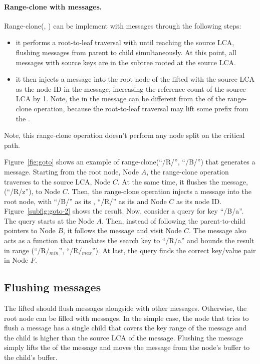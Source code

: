 \paragraph{Range-clone with \goto messages.}

Range-clone(\spre, \dpre) can be implement with \goto messages through the
following steps:
\begin{itemize}
\item it performs a root-to-leaf traversal with \spre until reaching the source
LCA, flushing messages from parent to child simultaneously.
At this point, all messages with source keys are in the subtree rooted at the
source LCA.
\item it then injects a \goto message into the root node of the lifted \bedag
with the source LCA as the node ID in the \goto message, increasing the
reference count of the source LCA by 1.
Note, the \spre in the \goto message can be different from the \spre of the
range-clone operation,
because the root-to-leaf traversal may lift some prefix from the \spre.
\end{itemize}
Note, this range-clone operation doesn't perform any node split on the critical
path.

Figure~\ref{fig:goto} shows an example of range-clone(``/R/'', ``/B/'')
that generates a \goto message.
Starting from the root node, Node $A$, the range-clone operation traverses to
the source LCA, Node $C$.
At the same time, it flushes the message, \delm(``/R/z''), to Node $C$.
Then, the range-clone operation injects a \goto message into the root node,
with ``/B/'' as its \dpre, ``/R/'' as its \spre and Node $C$ as its node ID.
Figure~\ref{subfig:goto-2} shows the result.
Now, consider a query for key ``/B/a''.
The query starts at the Node $A$.
Then, instead of following the parent-to-child pointers to Node $B$, it follows
the \goto message and visit Node $C$.
The \goto message also acts as a \xf function that translates the search key
to ``/R/a'' and bounds the result in range (``/R/$_{min}$'', ``/R/$_{max}$'').
At last, the query finds the correct key/value pair in Node $F$.

\subsection{Flushing \goto messages}
\label{sec:rc:flush}

The lifted \bedag should flush \goto messages alongside with other messages.
Otherwise, the root node can be filled with \goto messages.
In the simple case, the node that tries to flush a \goto message has a single
child that covers the key range of the \goto message
and the child is higher than the source LCA of the \goto message.
Flushing the \goto message simply lifts the \dpre of the \goto message and moves
the \goto message from the node's buffer to the child's buffer.

